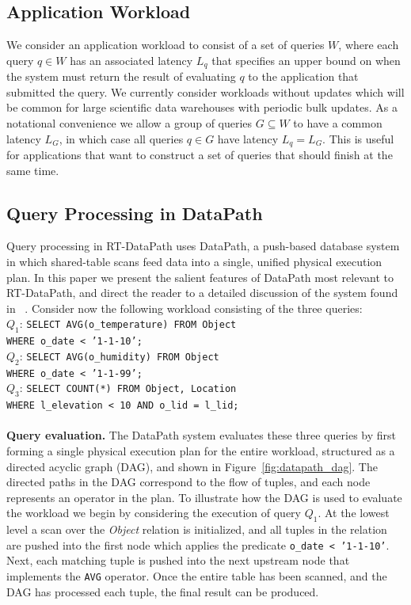 \documentclass{sig-alternate}
\begin{document}
\subsection{Application Workload}

We consider an application workload to consist of a set of queries $W$, where
each query $q \in W$ has an associated latency $L_q$ that specifies an upper
bound on when the system must return the result of evaluating $q$ to the
application that submitted the query. We currently consider workloads without
updates which will be common for large scientific data warehouses with
periodic bulk updates.  As a notational convenience we allow a group of
queries $G \subseteq W$ to have a common latency $L_G$, in which case all
queries $q \in G$ have latency $L_q = L_G$. This is useful for applications
that want to construct a set of queries that should finish at the same time.

\subsection{Query Processing in DataPath}
\label{sec:push}

Query processing in RT-DataPath uses DataPath, a push-based database system in
which shared-table scans feed data into a single, unified physical execution
plan. In this paper we present the salient features of DataPath most relevant
to RT-DataPath, and direct the reader to a detailed discussion of the system
found in ~\cite{arumugam:sigmod10}. Consider now the following workload
consisting of the three queries:\\

\noindent
$Q_1$: \texttt{SELECT AVG(o\_temperature) FROM Object\\
WHERE o\_date < '1-1-10';}\\

\noindent
$Q_2$: \texttt{SELECT AVG(o\_humidity) FROM Object\\
WHERE o\_date < '1-1-99';}\\

\noindent
$Q_3$: \texttt{SELECT COUNT(*) FROM Object, Location\\
WHERE l\_elevation < 10 AND o\_lid = l\_lid;}\\
\\
{\bf Query evaluation.} The DataPath system evaluates these three queries by
first forming a single physical execution plan for the entire workload,
structured as a directed acyclic graph (DAG), and shown in
Figure~\ref{fig:datapath_dag}. The directed paths in the DAG correspond to the
flow of tuples, and each node represents an operator in the plan. To
illustrate how the DAG is used to evaluate the workload we begin by
considering the execution of query $Q_1$. At the lowest level a scan over the
\emph{Object} relation is initialized, and all tuples in the relation are
pushed into the first node which applies the predicate \texttt{o\_date <
'1-1-10'}. Next, each matching tuple is pushed into the next upstream node
that implements the \texttt{AVG} operator. Once the entire table has been
scanned, and the DAG has processed each tuple, the final result can be
produced.
\end{document}
